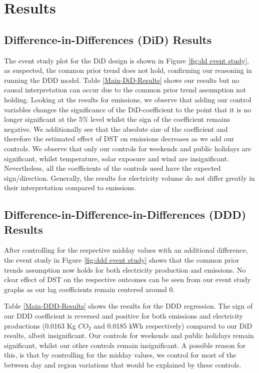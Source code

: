 
\section{Results}
\subsection{Difference-in-Differences (DiD) Results}

The event study plot for the \ac{DiD} design is shown in Figure \ref{fig:dd event study}, as suspected, the common prior trend does not hold, confirming our reasoning in running the \ac{DDD} model.
Table \ref{Main-DiD-Results} shows our results but no causal interpretation can occur due to the common prior trend assumption not holding. Looking at the results for emissions, we observe that adding our control variables changes the significance of the \ac{DiD}-coefficient to the point that it is no longer significant at the 5\% level whilst the sign of the coefficient remains negative. We additionally see that the absolute size of the coefficient and therefore the estimated effect of DST on emissions decreases as we add our controls. We observe that only our controls for weekends and public holidays are significant, whilst temperature, solar exposure and wind are insignificant. Nevertheless, all the coefficients of the controls used have the expected sign/direction. Generally, the results for electricity volume do not differ greatly in their interpretation compared to emissions.

\subsection{Difference-in-Difference-in-Differences (DDD) Results}

After controlling for the respective midday values with an additional difference, the event study in Figure \ref{fig:ddd event study} shows that the common prior trends assumption now holds for both electricity production and emissions. No clear effect of DST on the respective outcomes can be seen from our event study graphs as our lag coefficients remain centered around $0$.

Table \ref{Main-DDD-Results} shows the results for the \ac{DDD} regression. 
The sign of our \ac{DDD} coefficient is reversed and positive for both emissions and electricity productions (0.0163 Kg $CO_2$ and 0.0185 kWh respectively) compared to our \ac{DiD} results, albeit insignificant. Our controls for weekends and public holidays remain significant, whilst our other controls remain insignificant. A possible reason for this, is that by controlling for the midday values, we control for most of the between day and region variations that would be explained by these controls. 

